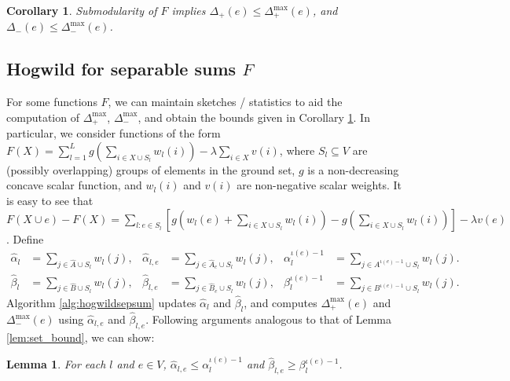 \documentclass{article} %
\newtheorem{cor}[thm]{Corollary}
\newtheorem{lem}[thm]{Lemma}
\begin{document}
\begin{cor}\label{cor:delta_bound}
Submodularity of $F$ implies
$\Delta_{+}(e) \leq \Delta_{+}^{\max}(e)$, and
$\Delta_{-}(e) \leq \Delta_{-}^{\max}(e)$.
\end{cor}

\subsection{Hogwild for separable sums $F$}
For some functions $F$, we can maintain sketches / statistics to aid the computation of $\Delta_+^{\max}$, $\Delta_-^{\max}$, and obtain the bounds given in Corollary \ref{cor:delta_bound}.
In particular, we consider functions of the form
$
F(X) = \sum_{l=1}^L g\left(\sum_{i\in X\cup S_l} w_l(i)\right) - \lambda\sum_{i\in X} v(i)$,
where $S_l \subseteq V$ are (possibly overlapping) groups of elements in the ground set, $g$ is a non-decreasing concave scalar function, and $w_l(i)$ and $v(i)$ are non-negative scalar weights.
It is easy to see that
$
F(X \cup e) - F(X) = \sum_{l: e\in S_l} \left[g\left(w_l(e) + \sum_{i\in X\cup S_l} w_l(i)\right) - g\left(\sum_{i\in X\cup S_l} w_l(i)\right)\right] - \lambda v(e)$.
Define
%
%
\begin{align*}
  \hat\alpha_l              &= \sum_{j\in \hat{A}\cup S_l} w_l(j),
& \hat\alpha_{l,e}          &= \sum_{j\in \hat{A}_e\cup S_l} w_l(j),
& \alpha_l^{\iota(e)-1} &= \sum_{j\in A^{\iota(e)-1}\cup S_l} w_l(j).\\
  \hat\beta_l              &= \sum_{j\in \hat{B}\cup S_l} w_l(j),
& \hat\beta_{l,e}          &= \sum_{j\in \hat{B}_e\cup S_l} w_l(j),
& \beta_l^{\iota(e)-1} &= \sum_{j\in B^{\iota(e)-1}\cup S_l} w_l(j).
\end{align*}
Algorithm \ref{alg:hogwildsepsum} updates $\hat\alpha_l$ and $\hat\beta_l$, and computes $\Delta_+^{\max}(e)$ and $\Delta_-^{\max}(e)$ using $\hat\alpha_{l,e}$ and $\hat\beta_{l,e}$.
Following arguments analogous to that of Lemma \ref{lem:set_bound}, we can show:

\begin{lem} For each $l$ and $e\in V$, $\hat\alpha_{l,e} \leq \alpha_l^{\iota(e)-1}$ and $\hat\beta_{l,e} \geq \beta_l^{\iota(e)-1}$.
\end{lem}
\end{document}
